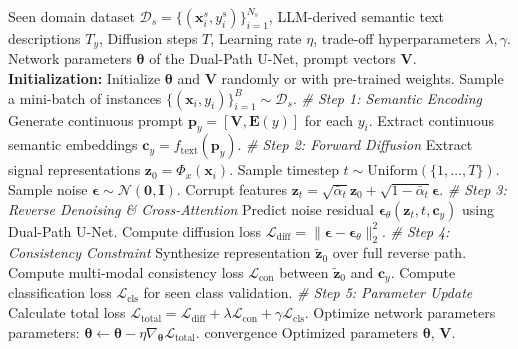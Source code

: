 \begin{algorithm}[H]
\caption{CDDM Training Procedure}
\label{alg:training}
\begin{algorithmic}[1]
\REQUIRE Seen domain dataset $\mathcal{D}_s = \{(\mathbf{x}_i^s, y_i^s)\}_{i=1}^{N_s}$, LLM-derived semantic text descriptions $T_y$, Diffusion steps $T$, Learning rate $\eta$, trade-off hyperparameters $\lambda, \gamma$.
\ENSURE Network parameters $\boldsymbol{\theta}$ of the Dual-Path U-Net, prompt vectors $\mathbf{V}$.
\STATE \textbf{Initialization:} Initialize $\boldsymbol{\theta}$ and $\mathbf{V}$ randomly or with pre-trained weights.
\REPEAT
    \STATE Sample a mini-batch of instances $\{(\mathbf{x}_i, y_i)\}_{i=1}^B \sim \mathcal{D}_s$.
    \STATE \textit{\# Step 1: Semantic Encoding}
    \STATE Generate continuous prompt $\mathbf{p}_y = [\mathbf{V}, \mathbf{E}(y)]$ for each $y_i$.
    \STATE Extract continuous semantic embeddings $\mathbf{c}_y = f_{\text{text}}(\mathbf{p}_y)$.
    \STATE \textit{\# Step 2: Forward Diffusion}
    \STATE Extract signal representations $\mathbf{z}_0 = \Phi_x(\mathbf{x}_i)$.
    \STATE Sample timestep $t \sim \text{Uniform}(\{1, \dots, T\})$.
    \STATE Sample noise $\boldsymbol{\epsilon} \sim \mathcal{N}(\mathbf{0}, \mathbf{I})$.
    \STATE Corrupt features $\mathbf{z}_t = \sqrt{\bar{\alpha}_t}\mathbf{z}_0 + \sqrt{1 - \bar{\alpha}_t}\boldsymbol{\epsilon}$.
    \STATE \textit{\# Step 3: Reverse Denoising \& Cross-Attention}
    \STATE Predict noise residual $\boldsymbol{\epsilon}_\theta(\mathbf{z}_t, t, \mathbf{c}_y)$ using Dual-Path U-Net.
    \STATE Compute diffusion loss $\mathcal{L}_{\text{diff}} = \| \boldsymbol{\epsilon} - \boldsymbol{\epsilon}_\theta \|_2^2$.
    \STATE \textit{\# Step 4: Consistency Constraint}
    \STATE Synthesize representation $\tilde{\mathbf{z}}_0$ over full reverse path.
    \STATE Compute multi-modal consistency loss $\mathcal{L}_{\text{con}}$ between $\tilde{\mathbf{z}}_0$ and $\mathbf{c}_y$.
    \STATE Compute classification loss $\mathcal{L}_{\text{cls}}$ for seen class validation.
    \STATE \textit{\# Step 5: Parameter Update}
    \STATE Calculate total loss $\mathcal{L}_{\text{total}} = \mathcal{L}_{\text{diff}} + \lambda \mathcal{L}_{\text{con}} + \gamma \mathcal{L}_{\text{cls}}$.
    \STATE Optimize network parameters parameters: $\boldsymbol{\theta} \leftarrow \boldsymbol{\theta} - \eta \nabla_{\boldsymbol{\theta}} \mathcal{L}_{\text{total}}$.
\UNTIL convergence
\RETURN Optimized parameters $\boldsymbol{\theta}$, $\mathbf{V}$.
\end{algorithmic}
\end{algorithm}

